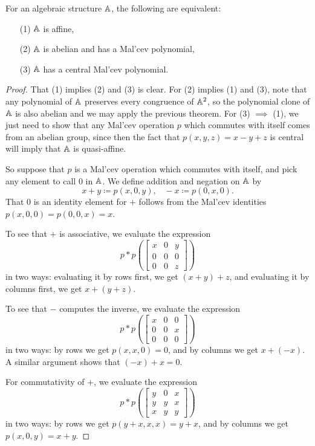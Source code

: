 \documentclass[letterpaper,11pt]{article}
\begin{document}
\begin{thm} For an algebraic structure $\mathbb{A}$, the following are equivalent:
\begin{itemize}
\item[(1)] $\mathbb{A}$ is affine,

\item[(2)] $\mathbb{A}$ is abelian and has a Mal'cev polynomial,

\item[(3)] $\mathbb{A}$ has a central Mal'cev polynomial.
\end{itemize}
\end{thm}
\begin{proof} That (1) implies (2) and (3) is clear. For (2) implies (1) and (3), note that any polynomial of $\mathbb{A}$ preserves every congruence of $\mathbb{A}^2$, so the polynomial clone of $\mathbb{A}$ is also abelian and we may apply the previous theorem. For (3) $\implies$ (1), we just need to show that any Mal'cev operation $p$ which commutes with itself comes from an abelian group, since then the fact that $p(x,y,z) = x-y+z$ is central will imply that $\mathbb{A}$ is quasi-affine.

So suppose that $p$ is a Mal'cev operation which commutes with itself, and pick any element to call $0$ in $\mathbb{A}$. We define addition and negation on $\mathbb{A}$ by
\[
x+y \coloneqq p(x,0,y), \;\;\; -x \coloneqq p(0,x,0).
\]
That $0$ is an identity element for $+$ follows from the Mal'cev identities $p(x,0,0) = p(0,0,x) = x$.

To see that $+$ is associative, we evaluate the expression
\[
p*p\left(\begin{bmatrix} x & 0 & y\\ 0 & 0 & 0\\ 0 & 0 & z\end{bmatrix}\right)
\]
in two ways: evaluating it by rows first, we get $(x+y)+z$, and evaluating it by columns first, we get $x+(y+z)$.

To see that $-$ computes the inverse, we evaluate the expression
\[
p*p\left(\begin{bmatrix} x & 0 & 0\\ 0 & 0 & x\\ 0 & 0 & 0\end{bmatrix}\right)
\]
in two ways: by rows we get $p(x,x,0) = 0$, and by columns we get $x+(-x)$. A similar argument shows that $(-x)+x = 0$.

For commutativity of $+$, we evaluate the expression
\[
p*p\left(\begin{bmatrix} y & 0 & x\\ y & y & x\\ x & y & y\end{bmatrix}\right)
\]
in two ways: by rows we get $p(y+x,x,x) = y+x$, and by columns we get $p(x,0,y) = x+y$.


\end{proof}
\end{document}

